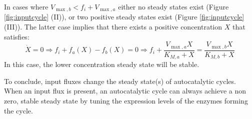     In cases where $V_{\max,b}<f_i+V_{\max,a}$ either no steady states exist (Figure \ref{fig:inputcycle} (II)), or two positive steady states exist (Figure \ref{fig:inputcycle} (III)).
    The latter case implies that there exists a positive concentration $X$ that satisfies:
    \begin{equation*}
        \dot X = 0 \Rightarrow f_i + f_a(X) - f_b(X) = 0 \Rightarrow f_i+\frac{V_{\max,a}X}{K_{M,a}+X} = \frac{V_{\max,b}X}{K_{M,b}+X}
    \end{equation*}
  In this case, the lower concentration steady state will be stable.

  To conclude, input fluxes change the steady state(s) of autocatalytic cycles.
  When an input flux is present, an autocatalytic cycle can always achieve a non zero, stable steady state by tuning the expression levels of the enzymes forming the cycle.
